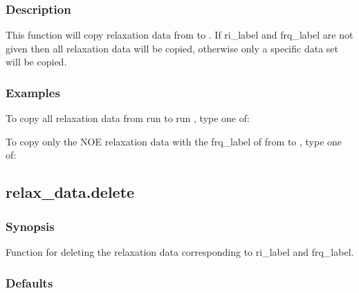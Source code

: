 \subsubsection{Description}

This function will copy relaxation data from  to .  If ri\_label and frq\_label are not given then all relaxation data will be copied, otherwise only a specific data set will be copied.



\subsubsection{Examples}

To copy all relaxation data from run  to run , type one of:






To copy only the NOE relaxation data with the frq\_label of  from  to , type one of:






\newpage

\subsection{relax\_data.delete}


\subsubsection{Synopsis}

Function for deleting the relaxation data corresponding to ri\_label and frq\_label.



\subsubsection{Defaults}

